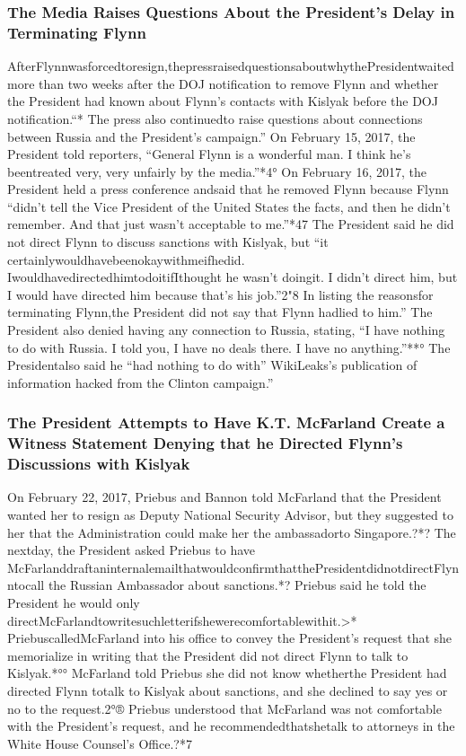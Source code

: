 \subsubsection{The Media Raises Questions About the President's Delay in Terminating Flynn}

AfterFlynnwasforcedtoresign,thepressraisedquestionsaboutwhythePresidentwaited more than two weeks after the DOJ notification to remove Flynn and whether the President had known about Flynn’s contacts with Kislyak before the DOJ notification.“* The press also continuedto raise questions about connections between Russia and the President’s campaign.” On February 15, 2017, the President told reporters, “General Flynn is a wonderful man. I think he’s beentreated very, very unfairly by the media.”*4° On February 16, 2017, the President held a press conference andsaid that he removed Flynn because Flynn “didn’t tell the Vice President of the United States the facts, and then he didn’t remember. And that just wasn’t acceptable to me.”*47 The President said he did not direct Flynn to discuss sanctions with Kislyak, but “it certainlywouldhavebeenokaywithmeifhedid. IwouldhavedirectedhimtodoitifIthought he wasn’t doingit. I didn’t direct him, but I would have directed him because that’s his job.”2"8 In listing the reasonsfor terminating Flynn,the President did not say that Flynn hadlied to him.” The President also denied having any connection to Russia, stating, “I have nothing to do with Russia. I told you, I have no deals there. I have no anything.”**° The Presidentalso said he “had nothing to do with” WikiLeaks’s publication of information hacked from the Clinton campaign.”

\subsubsection{The President Attempts to Have K.T. McFarland Create a Witness Statement Denying that he Directed Flynn's Discussions with Kislyak}

On February 22, 2017, Priebus and Bannon told McFarland that the President wanted her to resign as Deputy National Security Advisor, but they suggested to her that the Administration could make her the ambassadorto Singapore.?*? The nextday, the President asked Priebus to have McFarlanddraftaninternalemailthatwouldconfirmthatthePresidentdidnotdirectFlynntocall the Russian Ambassador about sanctions.*? Priebus said he told the President he would only directMcFarlandtowritesuchletterifshewerecomfortablewithit.>* PriebuscalledMcFarland into his office to convey the President’s request that she memorialize in writing that the President did not direct Flynn to talk to Kislyak.*°° McFarland told Priebus she did not know whetherthe President had directed Flynn totalk to Kislyak about sanctions, and she declined to say yes or no to the request.2°® Priebus understood that McFarland was not comfortable with the President’s request, and he recommendedthatshetalk to attorneys in the White House Counsel’s Office.?*7

